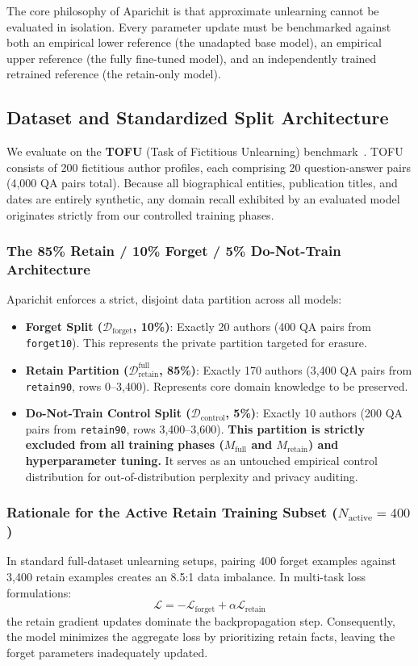 \documentclass[11pt,a4paper]{article}
\begin{document}
The core philosophy of Aparichit is that approximate unlearning cannot be evaluated in isolation. Every parameter update must be benchmarked against both an empirical lower reference (the unadapted base model), an empirical upper reference (the fully fine-tuned model), and an independently trained retrained reference (the retain-only model).

\subsection{Dataset and Standardized Split Architecture}
We evaluate on the \textbf{TOFU} (Task of Fictitious Unlearning) benchmark~\cite{maini2024tofu}. TOFU consists of 200 fictitious author profiles, each comprising 20 question-answer pairs (4,000 QA pairs total). Because all biographical entities, publication titles, and dates are entirely synthetic, any domain recall exhibited by an evaluated model originates strictly from our controlled training phases.

\subsubsection{The 85\% Retain / 10\% Forget / 5\% Do-Not-Train Architecture}
Aparichit enforces a strict, disjoint data partition across all models:
\begin{itemize}
    \item \textbf{Forget Split ($\mathcal{D}_{\text{forget}}$, 10\%)}: Exactly 20 authors (400 QA pairs from \texttt{forget10}). This represents the private partition targeted for erasure.
    \item \textbf{Retain Partition ($\mathcal{D}_{\text{retain}}^{\text{full}}$, 85\%)}: Exactly 170 authors (3,400 QA pairs from \texttt{retain90}, rows 0--3,400). Represents core domain knowledge to be preserved.
    \item \textbf{Do-Not-Train Control Split ($\mathcal{D}_{\text{control}}$, 5\%)}: Exactly 10 authors (200 QA pairs from \texttt{retain90}, rows 3,400--3,600). \textbf{This partition is strictly excluded from all training phases ($M_{\text{full}}$ and $M_{\text{retain}}$) and hyperparameter tuning.} It serves as an untouched empirical control distribution for out-of-distribution perplexity and privacy auditing.
\end{itemize}

\subsubsection{Rationale for the Active Retain Training Subset ($N_{\text{active}} = 400$)}
In standard full-dataset unlearning setups, pairing 400 forget examples against 3,400 retain examples creates an 8.5:1 data imbalance. In multi-task loss formulations:
\begin{equation}
\mathcal{L} = -\mathcal{L}_{\text{forget}} + \alpha \mathcal{L}_{\text{retain}}
\end{equation}
the retain gradient updates dominate the backpropagation step. Consequently, the model minimizes the aggregate loss by prioritizing retain facts, leaving the forget parameters inadequately updated. 
\end{document}
